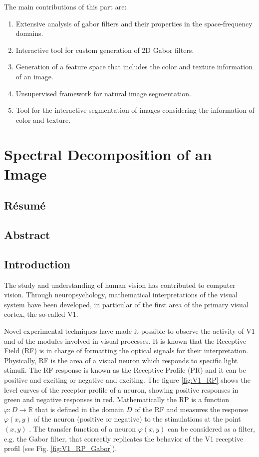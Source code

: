 The main contributions of this part are:
\begin{enumerate}
	\item Extensive analysis of gabor filters and their properties in the space-frequency domains.
	\item Interactive tool for custom generation of 2D Gabor filters.
	\item Generation of a feature space that includes the color and texture information of an image.
	\item Unsupervised framework for natural image segmentation.
	\item Tool for the interactive segmentation of images considering the information of color and texture.
\end{enumerate}

\chapter{Spectral Decomposition of an Image}\label{ch:image_spectral_decomposition}

\section*{Résumé}
\noindent 

\section*{Abstract}
\noindent 

\section{Introduction}

The study and understanding of human vision has contributed to computer vision. Through neuropsychology, mathematical interpretations of the visual system have been developed, in particular of the first area of the primary visual cortex, the so-called V1.

Novel experimental techniques \citep{DeAngelis.Ohzawa.ea:TN:1995} have made it possible to observe the activity of V1 and of the modules involved in visual processes. It is known that the Receptive Field (RF) is in charge of formatting the optical signals for their interpretation. Physically, RF is the area of a visual neuron which responds to specific light stimuli. The RF response is known as the Receptive Profile (PR) and it can be positive and exciting or negative and exciting. The figure \ref{fig:V1_RP} shows the level curves of the receptor profile of a neuron, showing positive responses in green and negative responses in red.
Mathematically the RP is a function $\varphi:  D \rightarrow \mathbb{R}$ that is defined in the domain $D$ of the RF and measures the response $\varphi(x,y)$ of the neuron (positive or negative) to the stimulations at the point $(x,y)$ \citep{Petitot:Neurogeometrie:2008}.
The transfer function of a neuron $\varphi(x,y)$ can be considered as a filter, e.g. the Gabor filter, that correctly replicates the behavior of the V1 receptive profil (see Fig. \ref{fig:V1_RP_Gabor}).

